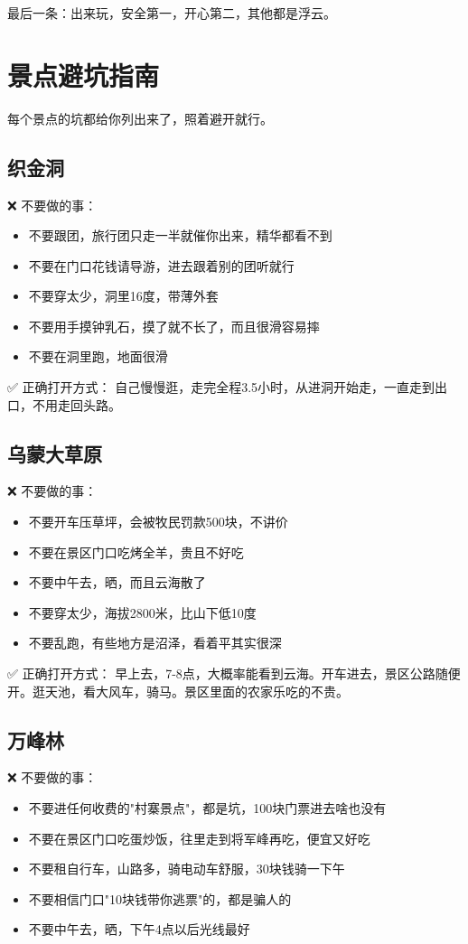 \documentclass[12pt,a4paper,UTF8]{ctexart}
\begin{document}
最后一条：出来玩，安全第一，开心第二，其他都是浮云。

\newpage

\section{景点避坑指南}

每个景点的坑都给你列出来了，照着避开就行。

\subsection{织金洞}
❌ 不要做的事：
\begin{itemize}
\item 不要跟团，旅行团只走一半就催你出来，精华都看不到
\item 不要在门口花钱请导游，进去跟着别的团听就行
\item 不要穿太少，洞里16度，带薄外套
\item 不要用手摸钟乳石，摸了就不长了，而且很滑容易摔
\item 不要在洞里跑，地面很滑
\end{itemize}

✅ 正确打开方式：
自己慢慢逛，走完全程3.5小时，从进洞开始走，一直走到出口，不用走回头路。

\subsection{乌蒙大草原}
❌ 不要做的事：
\begin{itemize}
\item 不要开车压草坪，会被牧民罚款500块，不讲价
\item 不要在景区门口吃烤全羊，贵且不好吃
\item 不要中午去，晒，而且云海散了
\item 不要穿太少，海拔2800米，比山下低10度
\item 不要乱跑，有些地方是沼泽，看着平其实很深
\end{itemize}

✅ 正确打开方式：
早上去，7-8点，大概率能看到云海。开车进去，景区公路随便开。逛天池，看大风车，骑马。景区里面的农家乐吃的不贵。

\subsection{万峰林}
❌ 不要做的事：
\begin{itemize}
\item 不要进任何收费的"村寨景点"，都是坑，100块门票进去啥也没有
\item 不要在景区门口吃蛋炒饭，往里走到将军峰再吃，便宜又好吃
\item 不要租自行车，山路多，骑电动车舒服，30块钱骑一下午
\item 不要相信门口"10块钱带你逃票"的，都是骗人的
\item 不要中午去，晒，下午4点以后光线最好
\end{itemize}
\end{document}
